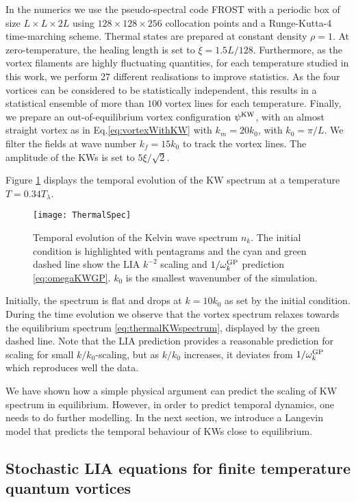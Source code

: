 \documentclass[sn-mathphys]{sn-jnl}%
\begin{document}
In the numerics we use the pseudo-spectral code FROST \cite{KrstulovicHDR} with a periodic box of size $L\times L\times 2L$ using $128\times128\times256$ collocation points and a Runge-Kutta-4 time-marching scheme. Thermal states are prepared at constant density $\rho=1$. At zero-temperature, the healing length is set to $\xi=1.5L/128$. Furthermore, as the vortex filaments are highly fluctuating quantities, for each temperature studied in this work, we perform 27 different realisations to improve statistics. As the four vortices can be considered to be statistically independent, this results in a statistical ensemble of more than $100$ vortex lines for each temperature. Finally, we prepare an out-of-equilibrium vortex configuration $\psi^{\rm KW}$, {with an almost straight vortex as in Eq.\eqref{eq:vortexWithKW}} with $k_m=20k_0$, with $k_0=\pi/L$. We filter the fields at wave number $k_f=15k_0$ to track the vortex lines. The amplitude of the KWs is set to $5\xi/\sqrt{2}$.

Figure \ref{fig:thermalspec} displays the temporal evolution of the KW spectrum at a temperature $T=0.34T_\lambda$. 
\begin{figure}[h]%
    \centering
    \texttt{[image: ThermalSpec]}
    \caption{Temporal evolution of the Kelvin wave spectrum $n_k$. The initial condition is highlighted with pentagrams and the cyan and green dashed line show the LIA $k^{-2}$ scaling and $1/\omega_k^{\rm GP}$ prediction \eqref{eq:omegaKWGP}. $k_0$ is the smallest wavenumber of the simulation.}\label{fig:thermalspec}
    \end{figure}
Initially, the spectrum is flat and drops at $k=10k_0$ as set by the initial condition. During the time evolution we observe that the vortex spectrum relaxes towards the equilibrium spectrum \eqref{eq:thermalKWspectrum}, displayed by the green dashed line. Note that the LIA prediction provides a reasonable prediction for scaling for small $k/k_0$-scaling, but as $k/k_0$ increases, it deviates from $1/\omega_k^{\rm GP}$ which reproduces well the data.

We have shown how a simple physical argument can predict the scaling of KW spectrum in equilibrium. However, in order to predict temporal dynamics, one needs to do further modelling. In the next section, we introduce a Langevin model that predicts the temporal behaviour of KWs close to equilibrium.



\subsection{Stochastic LIA equations for finite temperature quantum vortices} \label{sec:newNOISE}
\end{document}

